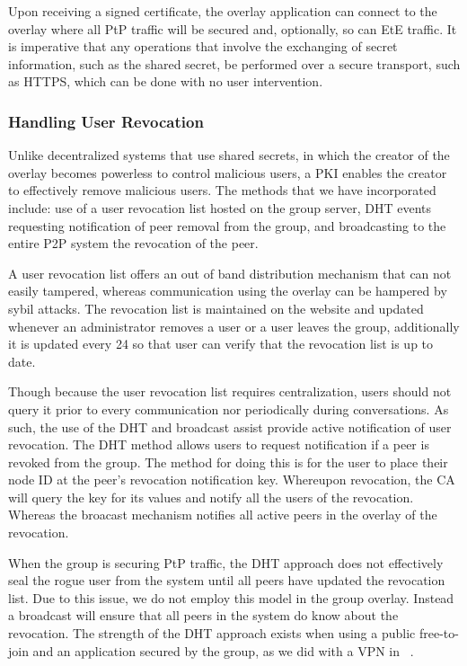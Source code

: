 \documentclass[conference]{IEEEtran}
\begin{document}
Upon receiving a signed certificate, the overlay application can connect to the
overlay where all PtP traffic will be secured and, optionally, so can EtE
traffic.  It is imperative that any operations that involve the exchanging of
secret information, such as the shared secret, be performed over a secure
transport, such as HTTPS, which can be done with no user intervention.

\subsubsection{Handling User Revocation}
Unlike decentralized systems that use shared secrets, in which the creator of
the overlay becomes powerless to control malicious users, a PKI enables the
creator to effectively remove malicious users.  The methods that we have
incorporated include:  use of a user revocation list hosted on the group server,
DHT events requesting notification of peer removal from the group, and
broadcasting to the entire P2P system the revocation of the peer.

A user revocation list offers an out of band distribution mechanism that can
not easily tampered, whereas communication using the overlay can be hampered
by sybil attacks.  The revocation list is maintained on the website and updated
whenever an administrator removes a user or a user leaves the group,
additionally it is updated every 24 so that user can verify that the revocation
list is up to date.

Though because the user revocation list requires centralization, users should
not query it prior to every communication nor periodically during conversations.
As such, the use of the DHT and broadcast assist provide active notification of
user revocation.  The DHT method allows users to request notification if a peer
is revoked from the group.  The method for doing this is for the user to place
their node ID at the peer's revocation notification key.  Whereupon revocation,
the CA will query the key for its values and notify all the users of the
revocation.  Whereas the broacast mechanism notifies all active peers in the
overlay of the revocation.

When the group is securing PtP traffic, the DHT approach does not effectively
seal the rogue user from the system until all peers have updated the revocation
list.  Due to this issue, we do not employ this model in the group overlay.
Instead a broadcast will ensure that all peers in the system do know about
the revocation.  The strength of the DHT approach exists when using a public
free-to-join and an application secured by the group, as we did with a VPN in
~\cite{nsdi10}.
\end{document}
